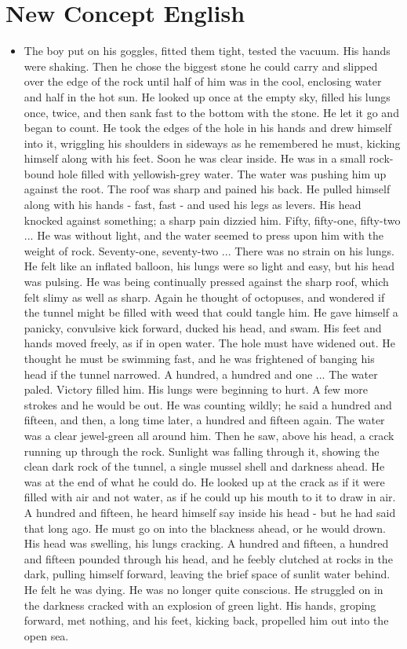 \chapter{New Concept English}
\begin{itemize}
\item The boy put on his goggles, fitted them tight, tested the vacuum. His hands were shaking. Then he chose the biggest stone he could carry and slipped over the edge of the rock until half of him was in the cool, enclosing water and half in the hot sun. He looked up once at the empty sky, filled his lungs once, twice, and then sank fast to the bottom with the stone. He let it go and began to count. He took the edges of the hole in his hands and drew himself into it, wriggling his shoulders in sideways as he remembered he must, kicking himself along with his feet. Soon he was clear inside. He was in a small rock-bound hole filled with yellowish-grey water. The water was pushing him up against the root. The roof was sharp and pained his back. He pulled himself along with his hands - fast, fast - and used his legs as levers. His head knocked against something; a sharp pain dizzied him. Fifty, fifty-one, fifty-two ... He was without light, and the water seemed to press upon him with the weight of rock. Seventy-one, seventy-two ... There was no strain on his lungs. He felt like an inflated balloon, his lungs were so light and easy, but his head was pulsing. He was being continually pressed against the sharp roof, which felt slimy as well as sharp. Again he thought of octopuses, and wondered if the tunnel might be filled with weed that could tangle him. He gave himself a panicky, convulsive kick forward, ducked his head, and swam. His feet and hands moved freely, as if in open water. The hole must have widened out. He thought he must be swimming fast, and he was frightened of banging his head if the tunnel narrowed. A hundred, a hundred and one ... The water paled. Victory filled him. His lungs were beginning to hurt. A few more strokes and he would be out. He was counting wildly; he said a hundred and fifteen, and then, a long time later, a hundred and fifteen again. The water was a clear jewel-green all around him. Then he saw, above his head, a crack running up through the rock. Sunlight was falling through it, showing the clean dark rock of the tunnel, a single mussel shell and darkness ahead. He was at the end of what he could do. He looked up at the crack as if it were filled with air and not water, as if he could up his mouth to it to draw in air. A hundred and fifteen, he heard himself say inside his head -  but he had said that long ago. He must go on into the blackness ahead, or he would drown. His head was swelling, his lungs cracking. A hundred and fifteen, a hundred and fifteen pounded through his head, and he feebly clutched at rocks in the dark, pulling himself forward, leaving the brief space of sunlit water behind. He felt he was dying. He was no longer quite conscious. He struggled on in the darkness cracked with an explosion of green light. His hands, groping forward, met nothing, and his feet, kicking back, propelled him out into the open sea.



\end{itemize}
